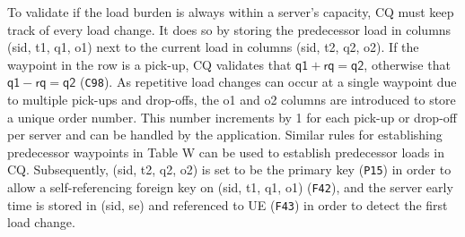 To validate if the load burden is always within a server's capacity, CQ must
keep track of every load change. It does so by storing the predecessor
load in columns (\textsf{sid}, \textsf{t1}, \textsf{q1}, \textsf{o1}) next to
the current load in columns (\textsf{sid}, \textsf{t2}, \textsf{q2},
\textsf{o2}).  If the waypoint in the row is a pick-up, CQ validates that
$\textsf{q1}+\textsf{rq}=\textsf{q2}$, otherwise that
$\textsf{q1}-\textsf{rq}=\textsf{q2}$ ({\tt{}C98}). As repetitive load changes can
occur at a single waypoint due to multiple pick-ups and drop-offs, the
\textsf{o1} and \textsf{o2} columns are introduced to store a unique
order number. This number increments by 1 for each pick-up or drop-off
per server and can be handled by the application. Similar rules for
establishing predecessor waypoints in Table W can be used to establish
predecessor loads in CQ.  Subsequently, (\textsf{sid}, \textsf{t2},
\textsf{q2}, \textsf{o2}) is set to be the primary key ({\tt{}P15}) in order to
allow a self-referencing foreign key on (\textsf{sid}, \textsf{t1},
\textsf{q1}, \textsf{o1}) ({\tt{}F42}), and the server early time is stored in
(\textsf{sid}, \textsf{se}) and referenced to UE ({\tt{}F43}) in order to detect
the first load change.
